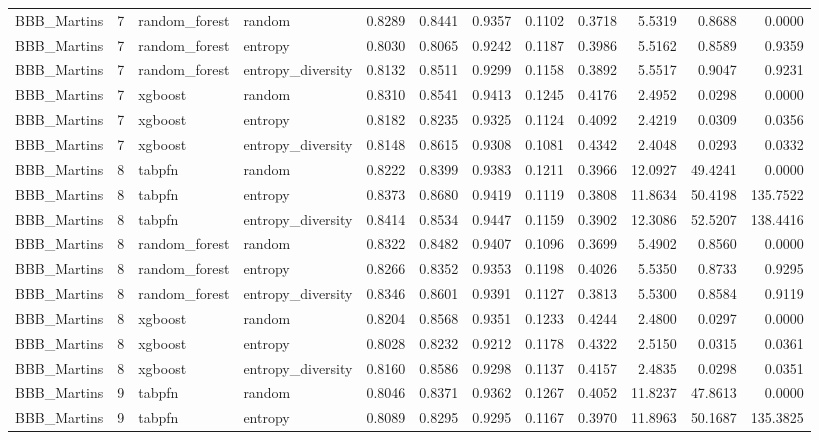 \begin{tabular}{lrllrrrrrrrr}
BBB_Martins & 7 & random_forest & random & 0.8289 & 0.8441 & 0.9357 & 0.1102 & 0.3718 & 5.5319 & 0.8688 & 0.0000 \\
BBB_Martins & 7 & random_forest & entropy & 0.8030 & 0.8065 & 0.9242 & 0.1187 & 0.3986 & 5.5162 & 0.8589 & 0.9359 \\
BBB_Martins & 7 & random_forest & entropy_diversity & 0.8132 & 0.8511 & 0.9299 & 0.1158 & 0.3892 & 5.5517 & 0.9047 & 0.9231 \\
BBB_Martins & 7 & xgboost & random & 0.8310 & 0.8541 & 0.9413 & 0.1245 & 0.4176 & 2.4952 & 0.0298 & 0.0000 \\
BBB_Martins & 7 & xgboost & entropy & 0.8182 & 0.8235 & 0.9325 & 0.1124 & 0.4092 & 2.4219 & 0.0309 & 0.0356 \\
BBB_Martins & 7 & xgboost & entropy_diversity & 0.8148 & 0.8615 & 0.9308 & 0.1081 & 0.4342 & 2.4048 & 0.0293 & 0.0332 \\
BBB_Martins & 8 & tabpfn & random & 0.8222 & 0.8399 & 0.9383 & 0.1211 & 0.3966 & 12.0927 & 49.4241 & 0.0000 \\
BBB_Martins & 8 & tabpfn & entropy & 0.8373 & 0.8680 & 0.9419 & 0.1119 & 0.3808 & 11.8634 & 50.4198 & 135.7522 \\
BBB_Martins & 8 & tabpfn & entropy_diversity & 0.8414 & 0.8534 & 0.9447 & 0.1159 & 0.3902 & 12.3086 & 52.5207 & 138.4416 \\
BBB_Martins & 8 & random_forest & random & 0.8322 & 0.8482 & 0.9407 & 0.1096 & 0.3699 & 5.4902 & 0.8560 & 0.0000 \\
BBB_Martins & 8 & random_forest & entropy & 0.8266 & 0.8352 & 0.9353 & 0.1198 & 0.4026 & 5.5350 & 0.8733 & 0.9295 \\
BBB_Martins & 8 & random_forest & entropy_diversity & 0.8346 & 0.8601 & 0.9391 & 0.1127 & 0.3813 & 5.5300 & 0.8584 & 0.9119 \\
BBB_Martins & 8 & xgboost & random & 0.8204 & 0.8568 & 0.9351 & 0.1233 & 0.4244 & 2.4800 & 0.0297 & 0.0000 \\
BBB_Martins & 8 & xgboost & entropy & 0.8028 & 0.8232 & 0.9212 & 0.1178 & 0.4322 & 2.5150 & 0.0315 & 0.0361 \\
BBB_Martins & 8 & xgboost & entropy_diversity & 0.8160 & 0.8586 & 0.9298 & 0.1137 & 0.4157 & 2.4835 & 0.0298 & 0.0351 \\
BBB_Martins & 9 & tabpfn & random & 0.8046 & 0.8371 & 0.9362 & 0.1267 & 0.4052 & 11.8237 & 47.8613 & 0.0000 \\
BBB_Martins & 9 & tabpfn & entropy & 0.8089 & 0.8295 & 0.9295 & 0.1167 & 0.3970 & 11.8963 & 50.1687 & 135.3825 \\

\end{tabular}
